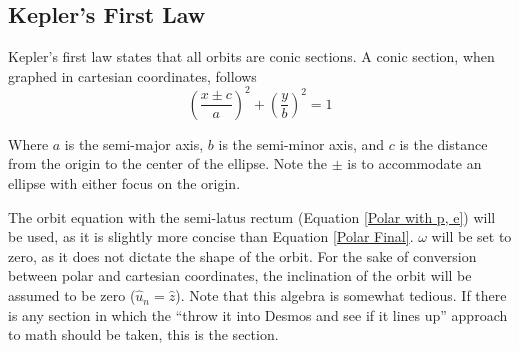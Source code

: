\documentclass[../basicOrbitalDynamics.tex]{subfiles}
\begin{document}
\bigskip\bigskip
\subsection{Kepler's First Law}\label{sec:Kepler's First Law}

Kepler's first law states that all orbits are conic sections. A conic section, when graphed in cartesian coordinates, follows
\[\left(\frac{x\pm{}c}{a}\right)^2+\left(\frac{y}{b}\right)^2=1\]

Where $a$ is the semi-major axis, $b$ is the semi-minor axis, and $c$ is the distance from the origin to the center of the ellipse. Note the $\pm$ is to accommodate an ellipse with either focus on the origin.

The orbit equation with the semi-latus rectum (Equation  \eqref{Polar with p, e}) will be used, as it is slightly more concise than Equation \eqref{Polar Final}. $\omega$ will be set to zero, as it does not dictate the shape of the orbit. For the sake of conversion between polar and cartesian coordinates, the inclination of the orbit will be assumed to be zero ($\hat{u}_n=\hat{z}$). Note that this algebra is somewhat tedious. If there is any section in which the ``throw it into Desmos and see if it lines up'' approach to math should be taken, this is the section.
\end{document}
